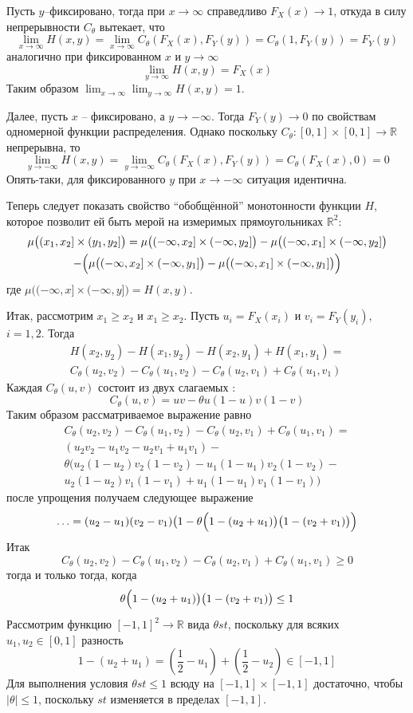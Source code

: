 \documentclass[a4paper]{article}
\newcommand{\Real}{\mathbb{R}}
\begin{document}
Пусть $y$--фиксировано, тогда при $x\to \infty$ справедливо $F_X(x)\to 1$, откуда в
силу непрерывности $C_\theta$ вытекает, что
\[
\lim_{x\to\infty} H(x,y)
= \lim_{x\to\infty} C_\theta(F_X(x),F_Y(y))
= C_\theta(1,F_Y(y))
= F_Y(y)
\]
аналогично при фиксированном $x$ и $y\to \infty$
\[\lim_{y\to\infty} H(x,y) = F_X(x)\]
Таким образом $\lim_{x\to\infty} \lim_{y\to\infty} H(x,y) = 1$.

Далее, пусть $x$ -- фиксировано, а $y\to -\infty$. Тогда $F_Y(y)\to 0$ по свойствам
одномерной функции распределения. Однако поскольку $C_\theta:[0,1]\times [0,1]\to \Real$
непрерывна, то
\[
\lim_{y\to-\infty} H(x,y)
= \lim_{y\to-\infty} C_\theta(F_X(x),F_Y(y))
= C_\theta(F_X(x),0)
= 0
\]
Опять-таки, для фиксированного $y$ при $x\to-\infty$ ситуация идентична.

Теперь следует показать свойство ``обобщённой'' монотонности функции $H$, которое
позволит ей быть мерой на измеримых прямоугольниках $\Real^2$:
\begin{multline*}
\mu\bigl((x_1,x_2]\times (y_1,y_2]\bigr)
= \mu\bigl((-\infty,x_2]\times (-\infty,y_2]\bigr)
- \mu\bigl((-\infty,x_1]\times (-\infty,y_2]\bigr) \\
- \Bigl( \mu\bigl((-\infty,x_2]\times (-\infty,y_1]\bigr)
	- \mu\bigl((-\infty,x_1]\times (-\infty,y_1]\bigr) \Bigr)
\end{multline*}
где $\mu\bigl((-\infty,x]\times (-\infty,y]\bigr) = H(x,y)$.

Итак, рассмотрим $x_1\geq x_2$ и $x_1\geq x_2$. Пусть $u_i=F_X(x_i)$ и $v_i=F_Y(y_i)$,
$i=1,2$. Тогда
\begin{multline*}
H(x_2,y_2) - H(x_1,y_2) - H(x_2,y_1) + H(x_1,y_1)
=  \\ C_\theta(u_2,v_2) - C_\theta(u_1,v_2) - C_\theta(u_2,v_1) + C_\theta(u_1,v_1)
\end{multline*}
Каждая $C_\theta(u,v)$ состоит из двух слагаемых :
\[C_\theta(u,v) = uv - \theta u(1-u) v(1-v)\]
Таким образом рассматриваемое выражение равно
\begin{multline*}
	C_\theta(u_2,v_2) - C_\theta(u_1,v_2) - C_\theta(u_2,v_1) + C_\theta(u_1,v_1) = \\
	( u_2v_2 - u_1v_2 - u_2v_1 + u_1v_1 ) - \\
		\theta ( u_2(1-u_2) v_2(1-v_2) - u_1(1-u_1) v_2(1-v_2) - \\ u_2(1-u_2) v_1(1-v_1) + u_1(1-u_1) v_1(1-v_1) )
\end{multline*}
после упрощения получаем следующее выражение
\[\ldots = (u_2-u_1)(v_2-v_1) \bigl( 1 - \theta \Bigl( 1 - (u_2 + u_1) \bigr)\bigl( 1 - (v_2 + v_1) \bigr) \Bigr)\]
Итак
\[C_\theta(u_2,v_2) - C_\theta(u_1,v_2) - C_\theta(u_2,v_1) + C_\theta(u_1,v_1) \geq 0\]
тогда и только тогда, когда
\[
\theta \Bigl( 1 - (u_2 + u_1) \bigr)\bigl( 1 - (v_2 + v_1) \bigr)\leq 1
\]
Рассмотрим функцию $[-1,1]^2\to\Real$ вида $\theta s t$, поскольку для всяких
$u_1,u_2\in[0,1]$ разность
\[1 - (u_2 + u_1) = (\frac{1}{2}-u_1)+(\frac{1}{2}-u_2)\in [-1,1]\]
Для выполнения условия $\theta st\leq 1$ всюду на $[-1,1]\times [-1,1]$ достаточно,
чтобы $\lvert \theta\rvert\leq1$, поскольку $st$ изменяется в пределах $[-1,1]$.
\end{document}
